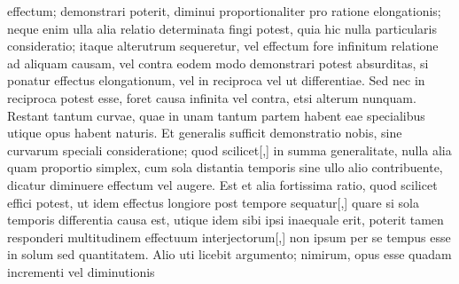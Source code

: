  effectum\protect{};
demonstrari poterit, diminui proportionaliter pro ratione elongationis;
neque enim ulla alia relatio determinata fingi potest,
quia hic nulla particularis consideratio;
itaque alterutrum sequeretur,
vel effectum fore infinitum\protect{} relatione ad aliquam causam\protect{},
vel contra eodem modo demonstrari potest absurditas,
si ponatur effectus\protect{} 
elongationum, vel in reciproca vel ut differentiae.
Sed nec in reciproca potest esse,
foret 
causa infinita\protect{} vel contra, etsi alterum nunquam.
Restant tantum curvae,
quae in unam tantum partem habent
eae specialibus utique opus habent naturis.
Et generalis sufficit demonstratio nobis,
sine curvarum speciali consideratione;
quod scilicet[,] in summa generalitate, nulla alia
quam proportio simplex,
cum sola distantia temporis sine ullo alio contribuente,
dicatur diminuere effectum\protect{} vel augere.
\pend
\pstart
Est et alia fortissima ratio, quod scilicet effici potest,
ut idem effectus\protect{} longiore post tempore sequatur[,]
quare si sola temporis differentia causa\protect{} est,
utique idem sibi ipsi inaequale erit,
poterit tamen responderi
multitudinem effectuum\protect{} interjectorum[,] non ipsum per se tempus esse in
solum sed quantitatem\protect{}.
Alio uti licebit argumento;
nimirum, opus esse quadam incrementi vel diminutionis
